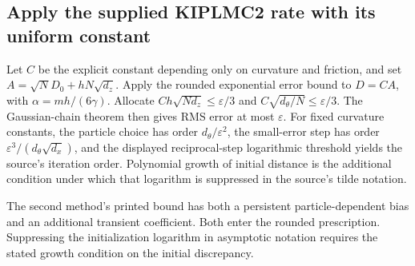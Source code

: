 \documentclass[11pt,a4paper]{report}
\begin{document}
\subsection{\texorpdfstring{Apply the supplied KIPLMC2 rate with its uniform constant}{Apply the supplied KIPLMC2 rate with its uniform constant}}
\label{report-step-KIPLMC-Accuracy-lean-4}


Let \(C\) be the explicit constant depending only on curvature and friction, and set \(A=\sqrt N D_0+hN\sqrt{d_z}\). Apply the rounded exponential error bound to \(D=CA\), with \(\alpha=mh/(6\gamma)\). Allocate \(Ch\sqrt{Nd_z}\le\varepsilon/3\) and \(C\sqrt{d_\theta/N}\le\varepsilon/3\). The Gaussian-chain theorem then gives RMS error at most \(\varepsilon\). For fixed curvature constants, the particle choice has order \(d_\theta/\varepsilon^2\), the small-error step has order \(\varepsilon^3/(d_\theta\sqrt{d_x})\), and the displayed reciprocal-step logarithmic threshold yields the source’s iteration order. Polynomial growth of initial distance is the additional condition under which that logarithm is suppressed in the source’s tilde notation.



The second method’s printed bound has both a persistent particle-dependent bias and an additional transient coefficient. Both enter the rounded prescription. Suppressing the initialization logarithm in asymptotic notation requires the stated growth condition on the initial discrepancy.
\end{document}
